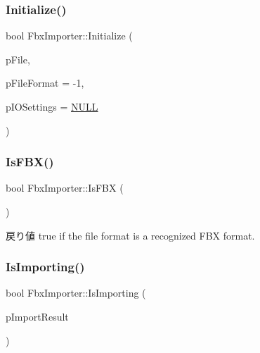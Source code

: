 \subsubsection{\texorpdfstring{Initialize()}{Initialize()}\hspace{0.1cm}{\footnotesize\ttfamily [3/3]}}
{\footnotesize\ttfamily bool Fbx\+Importer\+::\+Initialize (\begin{DoxyParamCaption}\item[{\hyperlink{class_fbx_file}{Fbx\+File} $\ast$}]{p\+File,  }\item[{const int}]{p\+File\+Format = {\ttfamily -\/1},  }\item[{\hyperlink{class_fbx_i_o_settings}{Fbx\+I\+O\+Settings} $\ast$}]{p\+I\+O\+Settings = {\ttfamily \hyperlink{fbxarch_8h_a070d2ce7b6bb7e5c05602aa8c308d0c4}{N\+U\+LL}} }\end{DoxyParamCaption})\hspace{0.3cm}{\ttfamily [protected]}}

\mbox{\label{class_fbx_importer_ad6746e77f928bd4dda0b722f557c6ac1}} 
\subsubsection{\texorpdfstring{Is\+F\+B\+X()}{IsFBX()}}
{\footnotesize\ttfamily bool Fbx\+Importer\+::\+Is\+F\+BX (\begin{DoxyParamCaption}{ }\end{DoxyParamCaption})}

\begin{DoxyReturn}{戻り値}
{\ttfamily true} if the file format is a recognized F\+BX format. 
\end{DoxyReturn}
\mbox{\label{class_fbx_importer_a8146a9982be07e4e287eb17b1c291c0b}} 
\subsubsection{\texorpdfstring{Is\+Importing()}{IsImporting()}}
{\footnotesize\ttfamily bool Fbx\+Importer\+::\+Is\+Importing (\begin{DoxyParamCaption}\item[{bool \&}]{p\+Import\+Result }\end{DoxyParamCaption})}

